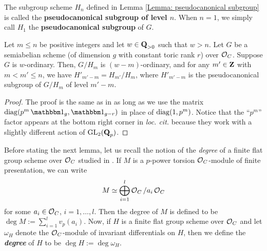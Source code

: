 \begin{Definition}
The subgroup scheme $H_n$ defined in Lemma \ref{Lemma: pseudocanonical subgroup} is called the \textbf{pseudocanonical subgroup of level $n$}. When $n= 1$, we simply call $H_1$ the \textbf{pseudocanonical subgroup} of $G$.
\end{Definition}

\begin{Lemma}\label{Lemma: pseudocanonical subgroups behave like canonical subgroups}
Let $m\leq n$ be positive integers and let $w\in \operatorname{\mathbf{Q}}_{>0}$ such that $w>n$. Let $G$ be a semiabelian scheme (of dimension $g$ with constant toric rank $r$) over $\operatorname{\mathcal{O}}_C$. Suppose $G$ is $w$-ordinary. Then, $G/H_{m}$ is $(w-m)$-ordinary, and for any $m'\in \operatorname{\mathbf{Z}}$ with $m < m' \leq  n$, we have $H'_{m'-m} = H_{m'}/H_{m}$, where $H'_{m'-m}$ is the pseudocanonical subgroup of $G/H_{m}$ of level $m'-m$.
\end{Lemma}

\begin{proof}
The proof is the same as in \cite[Lemma 2.11]{CHJ-2017} as long as we use the matrix $\diag(p^m\one_{g}, \one_{g-r})$ in place of $\operatorname{diag}(1, p^m)$. Notice that the ``$p^m$'' factor appears at the bottom right corner in \textit{loc. cit.} because they work with a slightly different action of $\operatorname{GL}_2(\operatorname{\mathbf{Q}}_p)$. 
\end{proof}

Before stating the next lemma, let us recall the notion of the \emph{degree} of a finite flat group scheme over $\operatorname{\mathcal{O}}_C$ studied in \cite{Fargues-canonical}. If $M$ is a $p$-power torsion $\operatorname{\mathcal{O}}_C$-module of finite presentation, we can write $$M\simeq \bigoplus_{i=1}^l \operatorname{\mathcal{O}}_C/a_i\operatorname{\mathcal{O}}_C$$
for some $a_i\in \operatorname{\mathcal{O}}_C$, $i=1,\ldots, l$. Then the degree of $M$ is defined to be $\deg M:= \sum_{i=1}^{l}v_p(a_i)$. Now, if $H$ is a finite flat group scheme over $\operatorname{\mathcal{O}}_C$ and let $\omega_H$ denote the $\operatorname{\mathcal{O}}_C$-module of invariant differentials on $H$, then we define the \textbf{\textit{degree}} of $H$ to be $\deg H:=\deg \omega_H$.

